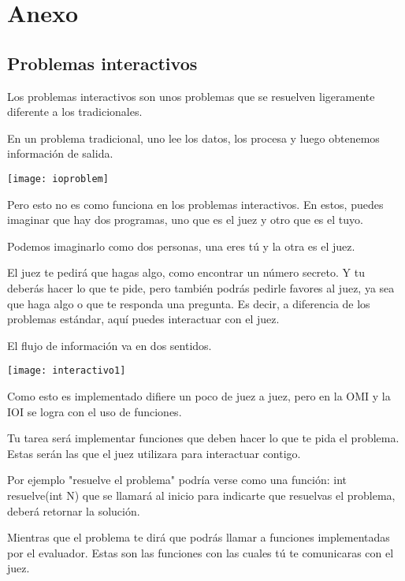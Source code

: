 \chapter*{Anexo}
\section*{Problemas interactivos}
\label{interactivos}

Los problemas interactivos son unos problemas que se resuelven ligeramente diferente a los tradicionales.

En un problema tradicional, uno lee los datos, los procesa y luego obtenemos información de salida.
\begin{center}	
	\texttt{[image: ioproblem]}
\end{center}

Pero esto no es como funciona en los problemas interactivos. En estos, puedes imaginar que hay dos programas, uno que es el juez y otro que es el tuyo.

Podemos imaginarlo como dos personas, una eres tú y la otra es el juez.

El juez te pedirá que hagas algo, como encontrar un número secreto. Y tu deberás hacer lo que te pide, pero también podrás pedirle favores al juez, ya sea que haga algo o que te responda una pregunta. Es decir, a diferencia de los problemas estándar, aquí puedes interactuar con el juez.

El flujo de información va en dos sentidos.

\begin{center}	
	\texttt{[image: interactivo1]}
\end{center}

Como esto es implementado difiere un poco de juez a juez, pero en la OMI y la IOI se logra con el uso de funciones.

Tu tarea será implementar funciones que deben hacer lo que te pida el problema. Estas serán las que el juez utilizara para interactuar contigo.

Por ejemplo "resuelve el problema" podría verse como una función: int resuelve(int N) que se llamará al inicio para indicarte que resuelvas el problema, deberá retornar la solución.

Mientras que el problema te dirá que podrás llamar a funciones implementadas por el evaluador. Estas son las funciones con las cuales tú te comunicaras con el juez.

